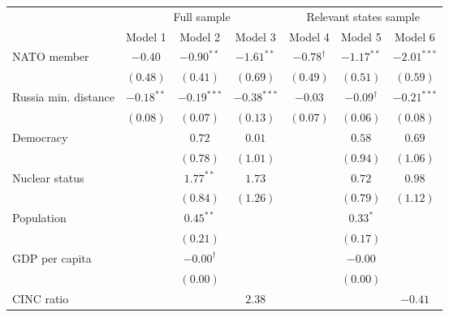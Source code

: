
\begin{table}[h]
\begin{center}
\begin{tabular}{l c c c c c c}
\hline
 & \multicolumn{3}{c}{Full sample} & \multicolumn{3}{c}{Relevant states sample} \\
\cline{2-4} \cline{5-7}
 & Model 1 & Model 2 & Model 3 & Model 4 & Model 5 & Model 6 \\
\hline
NATO member          & $-0.40$      & $-0.90^{**}$      & $-1.61^{**}$  & $-0.78^{\dagger}$ & $-1.17^{**}$      & $-2.01^{***}$ \\
                     & $(0.48)$     & $(0.41)$          & $(0.69)$      & $(0.49)$          & $(0.51)$          & $(0.59)$      \\
Russia min. distance & $-0.18^{**}$ & $-0.19^{***}$     & $-0.38^{***}$ & $-0.03$           & $-0.09^{\dagger}$ & $-0.21^{***}$ \\
                     & $(0.08)$     & $(0.07)$          & $(0.13)$      & $(0.07)$          & $(0.06)$          & $(0.08)$      \\
Democracy            &              & $0.72$            & $0.01$        &                   & $0.58$            & $0.69$        \\
                     &              & $(0.78)$          & $(1.01)$      &                   & $(0.94)$          & $(1.06)$      \\
Nuclear status       &              & $1.77^{**}$       & $1.73$        &                   & $0.72$            & $0.98$        \\
                     &              & $(0.84)$          & $(1.26)$      &                   & $(0.79)$          & $(1.12)$      \\
Population           &              & $0.45^{**}$       &               &                   & $0.33^{*}$        &               \\
                     &              & $(0.21)$          &               &                   & $(0.17)$          &               \\
GDP per capita       &              & $-0.00^{\dagger}$ &               &                   & $-0.00$           &               \\
                     &              & $(0.00)$          &               &                   & $(0.00)$          &               \\
CINC ratio           &              &                   & $2.38$        &                   &                   & $-0.41$       \\

\end{tabular}
\end{center}
\end{table}
